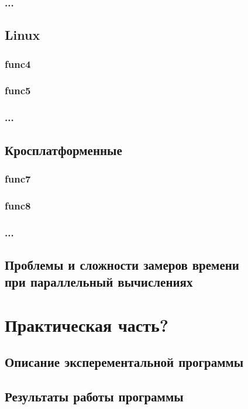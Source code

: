 \documentclass{article}
\begin{document}
			\subsubsection{...}
		\subsection{Linux}
			\subsubsection{func4}
			\subsubsection{func5}
			\subsubsection{...}
	\newpage
		\subsection{Кросплатформенные}
			\subsubsection{func7}
			\subsubsection{func8}
			\subsubsection{...}
		\subsection{Проблемы и сложности замеров времени \\ при параллельный вычислениях}
	\newpage
	\section{Практическая часть?}
		\subsection{Описание эксперементальной программы}
		\subsection{Результаты работы программы}
\end{document}
